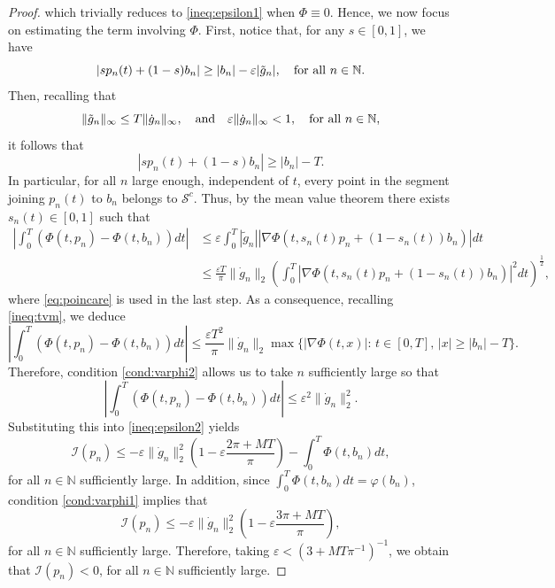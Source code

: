 \documentclass[10pt,a4paper]{amsart}
\newcommand{\boI}{\mathcal{I}}
\newcommand{\boS}{\mathcal{S}}
\begin{document}
\begin{proof}
    which trivially reduces to \eqref{ineq:epsilon1} when $\Phi \equiv 0$. Hence, we now focus on estimating the term involving $\Phi$. First, notice that, for any $s\in [0,1]$, we have 
\begin{equation*}
    |s p_n(t)+(1-s)b_n|\geq |b_n|-\varepsilon| \tilde g_n|,\quad\hbox{for all }n\in\mathbb{N}. 
\end{equation*}
Then, recalling that 
\begin{equation}
    \|\tilde g_n\|_\infty\leq T\|\dot g_n\|_\infty,\quad\hbox{and}\quad\varepsilon \|\dot g_n\|_\infty<1,\quad\hbox{for all }n\in\mathbb{N},
\end{equation}it follows that
\begin{equation}\label{ineq:tvm}
    |s p_n(t)+(1-s)b_n|\geq |b_n|-T.
\end{equation}
    In particular, for all $n$ large enough, independent of $t$, every point in the segment joining $p_n(t)$ to $b_n$ belongs to $\boS^c$. Thus, by the mean value theorem there exists $s_n(t)\in [0,1]$ such that
\begin{align*}
    \left|\int_0^T(\Phi(t,p_n)-\Phi(t,b_n))dt\right|&\leq \varepsilon\int_0^T|\tilde g_n||\nabla\Phi(t,s_n(t)p_n+(1-s_n(t))b_n)|dt
    \\
    &\leq\frac{\varepsilon T}{\pi}\|\dot g_n\|_2\left(\int_0^T \left|\nabla\Phi(t,s_n(t)p_n+(1-s_n(t))b_n)\right|^2dt\right)^\frac12,
\end{align*}
where \eqref{eq:poincare} is used in the last step. As a consequence, recalling \eqref{ineq:tvm}, we deduce
\begin{equation*}
    \left|\int_0^T(\Phi(t,p_n)-\Phi(t,b_n))dt\right|\leq \frac{\varepsilon T^2}{\pi}\|\dot g_n\|_2\max\{|\nabla\Phi(t,x)|:\, t\in [0,T],\, |x|\geq|b_n|-T\}.
\end{equation*}
Therefore, condition \eqref{cond:varphi2} allows us to take $n$ sufficiently large so that
\begin{equation*}
    \left|\int_0^T(\Phi(t,p_n)-\Phi(t,b_n))dt\right|\leq \varepsilon^2\|\dot g_n\|_2^2.
\end{equation*}
Substituting this into \eqref{ineq:epsilon2} yields
\begin{equation}\label{ineq:epsilon2'}
        \boI(p_n) \leq-\varepsilon\|\dot{g}_n\|_2^2   \left(1-\varepsilon\frac{2\pi+MT}{\pi}\right)- \int_0^T\Phi(t,b_n)dt,
    \end{equation}
    for all $n\in\mathbb{N}$ sufficiently large. In addition, since $\int_0^T\Phi(t,b_n)dt=\varphi(b_n)$, condition \eqref{cond:varphi1} implies that
\begin{equation*}
        \boI(p_n) \leq-\varepsilon\|\dot{g}_n\|_2^2   \left(1-\varepsilon\frac{3\pi+MT}{\pi}\right),
    \end{equation*}
    for all $n \in \mathbb{N}$ sufficiently large. Therefore, taking $\varepsilon < \left(3 + MT\pi^{-1}\right)^{-1}$, we obtain that $\boI(p_n) < 0$, for all $n \in \mathbb{N}$ sufficiently large.
\end{proof}
\end{document}
